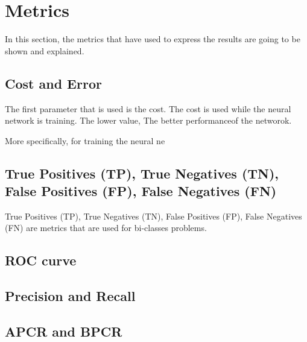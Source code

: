 \section{Metrics}
In this section, the metrics that have used to express the results are going to be shown and explained.

\subsection{Cost and Error}
The first parameter that is used is the cost. The cost is used while the neural network is training. The lower value, The better performanceof the networok.

More specifically, for training the neural ne

\subsection{True Positives (TP), True Negatives (TN), False Positives (FP), False Negatives (FN)}
True Positives (TP), True Negatives (TN), False Positives (FP), False Negatives (FN) are metrics that are used for bi-classes problems.

\subsection{ROC curve}

\subsection{Precision and Recall}

\subsection{APCR and BPCR}
